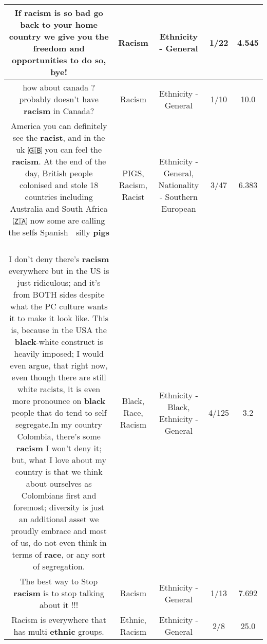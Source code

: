 \documentclass[11pt]{article}
\newlength\mylength
\begin{document}
\begin{center}
\begin{longtable}{|C{.65\mylength}|C{.30\mylength}|C{.12\mylength}|C{.12\mylength}|C{.12\mylength}|}
  \small If \textbf{racism} is so bad go back to your home country we give you the freedom and opportunities to do so, bye!\normalsize   & Racism & Ethnicity - General & 1/22 & 4.545 \\  \hline
  \small how about canada ? probably doesn't have \textbf{racism} in Canada?\normalsize   & Racism & Ethnicity - General & 1/10 & 10.0 \\  \hline
  \small America you can definitely see the \textbf{racist}, and in the uk 🇬🇧 you can feel the \textbf{racism}. At the end of the day, British people colonised and stole 18 countries including Australia and South Africa 🇿🇦 now some are calling the selfs Spanish 🤢 silly \textbf{pigs} 🐷\normalsize   & PIGS, Racism, Racist & Ethnicity - General, Nationality - Southern European & 3/47 & 6.383 \\  \hline
  \small I don't deny there's \textbf{racism} everywhere but in the US is just ridiculous; and it's from BOTH sides despite what the PC culture wants it to make it look like. This is, because in the USA the \textbf{black}-white construct is heavily imposed; I would even argue, that right now, even though there are still white racists, it is even more pronounce on \textbf{black} people that do tend to self segregate.In my country Colombia, there's some \textbf{racism} I won't deny it; but, what I love about my country is that we think about ourselves as Colombians first and foremost; diversity is just an additional asset we proudly embrace and most of us, do not even think in terms of \textbf{race}, or any sort of segregation.\normalsize   & Black, Race, Racism & Ethnicity - Black, Ethnicity - General & 4/125 & 3.2 \\  \hline
  \small The best way to Stop \textbf{racism} is to stop talking about it !!!\normalsize   & Racism & Ethnicity - General & 1/13 & 7.692 \\  \hline
  \small Racism is everywhere that has multi \textbf{ethnic} groups.\normalsize   & Ethnic, Racism & Ethnicity - General & 2/8 & 25.0 \\  \hline

\end{longtable}
\end{center}
\end{document}
